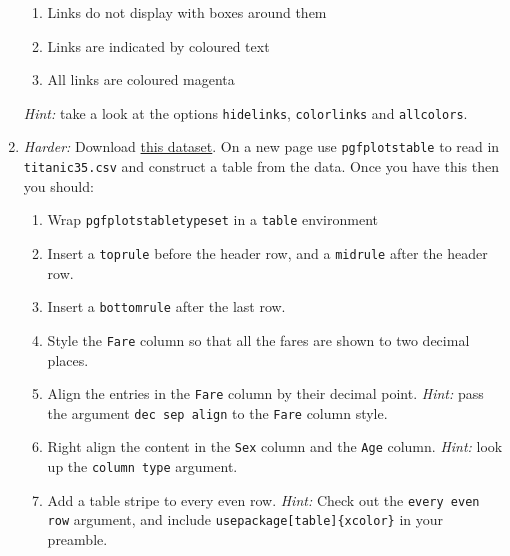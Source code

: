 \documentclass{article}
\begin{document}
\begin{enumerate}[label=\color{purple}\theenumi.]
    \begin{enumerate}[label=\color{purple}\roman*)]

      \item Links do not display with boxes around them

      \item Links are indicated by coloured text

      \item All links are coloured magenta

    \end{enumerate}

    \textsl{Hint:} take a look at the options \texttt{hidelinks},
    \texttt{colorlinks} and \texttt{allcolors}.

  \item \emph{Harder:} Download
    \href{https://jwalton.info/assets/teaching/latex/titanic35.csv}%
    {this dataset}. On a new page use \texttt{pgfplotstable} to read in 
    \texttt{titanic35.csv} and construct a table from the data. Once you have
    this then you should:

    \begin{enumerate}[label=\color{purple}\roman*)]

      \item Wrap \texttt{pgfplotstabletypeset} in a \texttt{table} environment

      \item Insert a \texttt{toprule} before the header row, and a
        \texttt{midrule} after the header row.

      \item Insert a \texttt{bottomrule} after the last row.

      \item Style the \texttt{Fare} column so that all the fares are shown to
        two decimal places.

      \item Align the entries in the \texttt{Fare} column by their decimal
        point. \emph{Hint:} pass the argument \texttt{dec sep align} to the 
        \texttt{Fare} column style.

      \item Right align the content in the \texttt{Sex} column and the
        \texttt{Age} column. \emph{Hint:} look up the \texttt{column type}
	argument.

      \item Add a table stripe to every even row. \emph{Hint:} Check out the 
        \texttt{every even row} argument, and include 
        \texttt{\tb usepackage[table]\{xcolor\}} in your preamble.

    \end{enumerate}

\end{enumerate}
\end{document}
